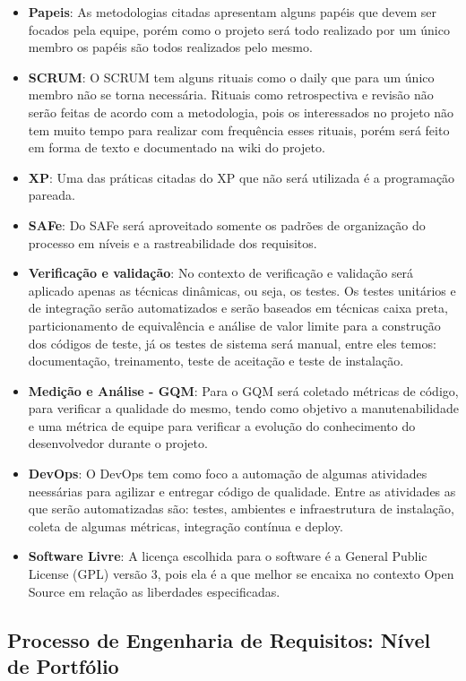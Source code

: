 \begin{itemize}
  \item \textbf{Papeis}: As metodologias citadas apresentam alguns papéis que devem ser focados pela equipe, porém como o projeto será todo realizado por um único membro os papéis são todos realizados pelo mesmo.
  \item \textbf{SCRUM}: O SCRUM tem alguns rituais como o daily que para um único membro não se torna necessária.  Rituais como retrospectiva e revisão não serão feitas de acordo com a metodologia, pois os interessados no projeto não tem muito tempo para realizar com frequência esses rituais, porém será feito em forma de texto e documentado na wiki do projeto.
  \item \textbf{XP}: Uma das práticas citadas do XP que não será utilizada é a programação pareada.
  \item \textbf{SAFe}: Do SAFe será aproveitado somente os padrões de organização do processo em níveis e a rastreabilidade dos requisitos.
  \item \textbf{Verificação e validação}: No contexto de verificação e validação será aplicado apenas as técnicas dinâmicas, ou seja, os testes. Os testes unitários e de integração serão automatizados e serão baseados em técnicas caixa preta, particionamento de equivalência e análise de valor limite para a construção dos códigos de teste, já os testes de sistema será manual, entre eles temos: documentação, treinamento, teste de aceitação e teste de instalação.
  \item \textbf{Medição e Análise - GQM}: Para o GQM será coletado métricas de código, para verificar a qualidade do mesmo, tendo como objetivo a manutenabilidade e uma métrica de equipe para verificar a evolução do conhecimento do desenvolvedor durante o projeto.
  \item \textbf{DevOps}: O DevOps tem como foco a automação de algumas atividades neessárias para agilizar e entregar código de qualidade. Entre as atividades as que serão automatizadas são: testes, ambientes e infraestrutura de instalação, coleta de algumas métricas, integração contínua e deploy.
  \item \textbf{Software Livre}: A licença escolhida para o software é a General Public License (GPL) versão 3, pois ela é a que melhor se encaixa no contexto Open Source em relação as liberdades especificadas.
\end{itemize}

\subsection{Processo de Engenharia de Requisitos: Nível de Portfólio}

